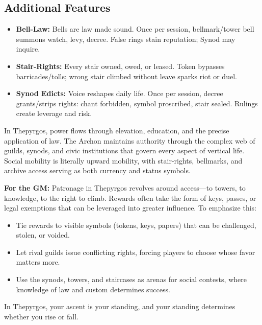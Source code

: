 \subsection*{Additional Features}
\begin{itemize}
\item \textbf{Bell-Law:} Bells are law made sound. Once per session, bellmark/tower bell summons watch, levy, decree. False rings stain reputation; Synod may inquire.
\item \textbf{Stair-Rights:} Every stair owned, owed, or leased. Token bypasses barricades/tolls; wrong stair climbed without leave sparks riot or duel.
\item \textbf{Synod Edicts:} Voice reshapes daily life. Once per session, decree grants/strips rights: chant forbidden, symbol proscribed, stair sealed. Rulings create leverage and risk.
\end{itemize}

\begin{tcolorbox}[colback=black!3,colframe=black!40!white,title={Patronage \& Power}]
In Thepyrgos, power flows through elevation, education, and the precise application of law. The Archon maintains authority through the complex web of guilds, synods, and civic institutions that govern every aspect of vertical life. Social mobility is literally upward mobility, with stair-rights, bellmarks, and archive access serving as both currency and status symbols.

\textbf{For the GM:}  
Patronage in Thepyrgos revolves around access---to towers, to knowledge, to the right to climb. Rewards often take the form of keys, passes, or legal exemptions that can be leveraged into greater influence. To emphasize this:
\begin{itemize}
\item Tie rewards to visible symbols (tokens, keys, papers) that can be challenged, stolen, or voided.
\item Let rival guilds issue conflicting rights, forcing players to choose whose favor matters more.
\item Use the synods, towers, and staircases as arenas for social contests, where knowledge of law and custom determines success.
\end{itemize}
In Thepyrgos, your ascent is your standing, and your standing determines whether you rise or fall.
\end{tcolorbox}


